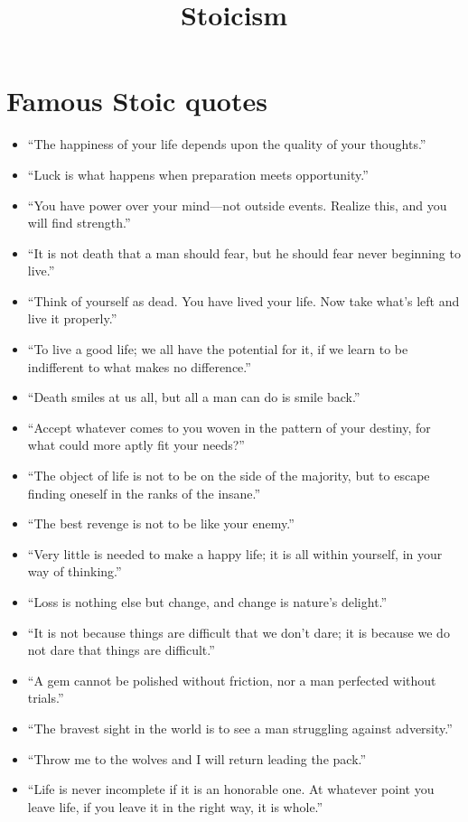 \documentclass{article}
\title{Stoicism}
\begin{document}
\section{Famous Stoic quotes}
    \begin{itemize}
        \item “The happiness of your life depends upon the quality of your thoughts.”
        \item “Luck is what happens when preparation meets opportunity.”
        \item “You have power over your mind—not outside events. Realize this, and you will find strength.”
        \item “It is not death that a man should fear, but he should fear never beginning to live.”
        \item “Think of yourself as dead. You have lived your life. Now take what’s left and live it properly.”
        \item “To live a good life; we all have the potential for it, if we learn to be indifferent to what makes no difference.”
        \item “Death smiles at us all, but all a man can do is smile back.”
        \item “Accept whatever comes to you woven in the pattern of your destiny, for what could more aptly fit your needs?”
        \item “The object of life is not to be on the side of the majority, but to escape finding oneself in the ranks of the insane.”
        \item “The best revenge is not to be like your enemy.”
        \item “Very little is needed to make a happy life; it is all within yourself, in your way of thinking.”
        \item “Loss is nothing else but change, and change is nature’s delight.”
        \item “It is not because things are difficult that we don’t dare; it is because we do not dare that things are difficult.”
        \item “A gem cannot be polished without friction, nor a man perfected without trials.”
        \item “The bravest sight in the world is to see a man struggling against adversity.”
        \item “Throw me to the wolves and I will return leading the pack.”
        \item “Life is never incomplete if it is an honorable one. At whatever point you leave life, if you leave it in the right way, it is whole.”

\end{itemize}
\end{document}
